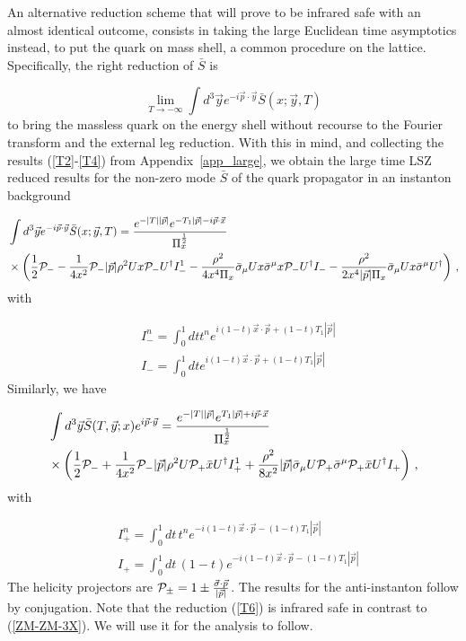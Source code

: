\documentclass[11pt,aps,amsmath,amssymb,nofootinbib,notitlepage,longbibliography]{revtex4-1}
\newcommand{\be}{\begin{equation}}
\newcommand{\ee}{\end{equation}}
\begin{document}
An alternative reduction scheme that will prove to be infrared safe with an almost identical outcome, consists in taking the
large Euclidean  time asymptotics instead, to put the quark on mass shell, a common procedure on the lattice. Specifically,  the right reduction of $\bar S$  is

\be
\label{T0}
\lim_{T\rightarrow - \infty}\int d^3\vec{y} e^{-i\vec{p}\cdot \vec{y}}\bar S(x;\vec{y},T)
\ee
to bring the massless quark on the energy shell without recourse to the Fourier transform and the external leg reduction.
 With this in mind, and collecting the results (\ref{T2}-\ref{T4}) from Appendix~\ref{app_large},
 we obtain the large time LSZ reduced results for the non-zero mode  $\bar S$
of the quark propagator in an instanton background

\begin{align}
\label{T6}
&\int d^3\vec{y} e^{-i\vec{p}\cdot \vec{y}}\bar S(x;\vec{y},T)=\frac{e^{-|T||\vec{p}|}e^{-T_1|\vec{p}|-i\vec{p}\cdot \vec{x}}}{\Pi_x^{\frac{1}{2}}}\nonumber \\
&\times \bigg(\frac{1}{2}{\cal P}_--\frac{1}{4x^2}{\cal P}_-|\vec{p}|\rho^2Ux{\cal P}_-U^{\dagger}I_-^1-\frac{\rho^2}{4x^4\Pi_x}\bar \sigma_{\mu}Ux\bar\sigma^{\mu}x{\cal P}_-U^{\dagger}I_--\frac{\rho^2}{2x^4|\vec{p}|\Pi_x}\bar \sigma_{\mu}Ux\bar\sigma^{\mu}U^{\dagger}\bigg) \ ,
\end{align}
with

\begin{align}
&I_-^n=\int_0^1 dt t^ne^{i(1-t)\vec{x}\cdot \vec{p}+(1-t)T_1|\vec{p}|}\nonumber\\
&I_-=\int_0^1 dt e^{i(1-t)\vec{x}\cdot \vec{p}+(1-t)T_1|\vec{p}|}
\end{align}
Similarly, we have

\begin{align}
\label{T7}
&\int d^3\vec{y}\bar S(T,\vec{y};x)e^{i\vec{p}\cdot \vec{y}}=\frac{e^{-|T||\vec{p}|}e^{T_1|\vec{p}|+i\vec{p}\cdot \vec{x}}}{\Pi_x^{\frac{1}{2}}}\nonumber \\
&\times \bigg(\frac{1}{2}{\cal P}_-+\frac{1}{4x^2}{\cal P}_-|\vec{p}|\rho^2U{\cal P}_+\bar xU^{\dagger}I_+^1+\frac{\rho^2}{8x^2}|\vec{p}|\bar \sigma_{\mu}U{\cal P}_{+}\bar \sigma^{\mu}{\cal P}_{+}\bar xU^{\dagger}I_+\bigg) \ ,
\end{align}
with

\begin{align}
&I_+^n=\int_{0}^1dt\, t^n e^{-i(1-t)\vec{x}\cdot \vec{p}-(1-t)T_1|\vec{p}|}\nonumber\\
&I_+=\int_{0}^1dt\,(1-t)e^{-i(1-t)\vec{x}\cdot \vec{p}-(1-t)T_1|\vec{p}|}
\end{align}
The helicity
projectors are
${\cal P}_{\pm}=1\pm\frac{\vec{\sigma}\cdot \vec{p}}{|\vec{p}|}$. The results for the anti-instanton follow by conjugation. Note that the reduction (\ref{T6})
is infrared safe in contrast to (\ref{ZM-ZM-3X}). We will use it for the analysis to follow.
\end{document}
